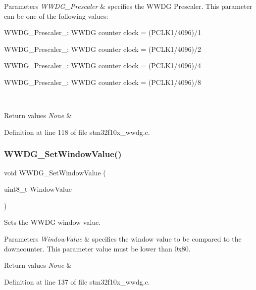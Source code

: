 \begin{DoxyParams}{Parameters}
{\em W\+W\+D\+G\+\_\+\+Prescaler} & specifies the W\+W\+DG Prescaler. This parameter can be one of the following values\+: \begin{DoxyItemize}
\item W\+W\+D\+G\+\_\+\+Prescaler\+\_\+: W\+W\+DG counter clock = (P\+C\+L\+K1/4096)/1 \item W\+W\+D\+G\+\_\+\+Prescaler\+\_\+: W\+W\+DG counter clock = (P\+C\+L\+K1/4096)/2 \item W\+W\+D\+G\+\_\+\+Prescaler\+\_\+: W\+W\+DG counter clock = (P\+C\+L\+K1/4096)/4 \item W\+W\+D\+G\+\_\+\+Prescaler\+\_\+: W\+W\+DG counter clock = (P\+C\+L\+K1/4096)/8 \end{DoxyItemize}
\\
\hline
\end{DoxyParams}

\begin{DoxyRetVals}{Return values}
{\em None} & \\
\hline
\end{DoxyRetVals}


Definition at line 118 of file stm32f10x\+\_\+wwdg.\+c.

\mbox{\label{group___w_w_d_g___private___functions_gaf44a7bf8bf6b11b41cd89ff521fdd5a5}} 
\subsubsection{\texorpdfstring{W\+W\+D\+G\+\_\+\+Set\+Window\+Value()}{WWDG\_SetWindowValue()}}
{\footnotesize\ttfamily void W\+W\+D\+G\+\_\+\+Set\+Window\+Value (\begin{DoxyParamCaption}\item[{uint8\+\_\+t}]{Window\+Value }\end{DoxyParamCaption})}



Sets the W\+W\+DG window value. 


\begin{DoxyParams}{Parameters}
{\em Window\+Value} & specifies the window value to be compared to the downcounter. This parameter value must be lower than 0x80. \\
\hline
\end{DoxyParams}

\begin{DoxyRetVals}{Return values}
{\em None} & \\
\hline
\end{DoxyRetVals}


Definition at line 137 of file stm32f10x\+\_\+wwdg.\+c.

